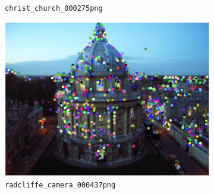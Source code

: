 \documentclass[a4paper,10pt]{article}
\begin{document}
\begin{figure}
\begin{subfigure}{0.49\textwidth}
    \caption{\texttt{christ\_church\_000275png}}
    \label{sfig:cc275}
  \end{subfigure}
  \begin{subfigure}{0.49\textwidth}
    \centering
    \includegraphics[width=\textwidth,height=.3\textheight,keepaspectratio]{randomimage5}
    \caption{\texttt{radcliffe\_camera\_000437png}}
    \label{sfig:rc437}
  \end{subfigure}
  \begin{subfigure}{0.49\textwidth}
    \centering

\end{subfigure}
\end{figure}
\end{document}
